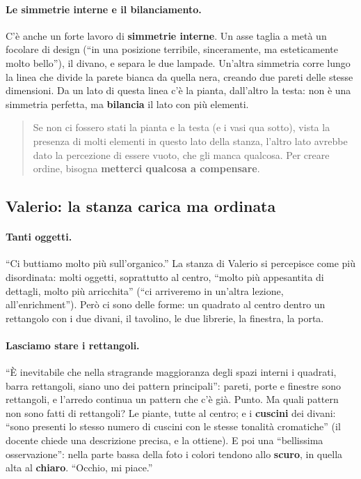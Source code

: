 \paragraph{Le simmetrie interne e il bilanciamento.} C'è anche un forte lavoro di
\textbf{simmetrie interne}. Un asse taglia a metà un focolare di design (``in una
posizione terribile, sinceramente, ma esteticamente molto bello''), il divano, e separa
le due lampade. Un'altra simmetria corre lungo la linea che divide la parete bianca da
quella nera, creando due pareti delle stesse dimensioni. Da un lato di questa linea c'è
la pianta, dall'altro la testa: non è una simmetria perfetta, ma \textbf{bilancia} il
lato con più elementi.
\begin{quote}
Se non ci fossero stati la pianta e la testa (e i vasi qua sotto), vista la presenza di
molti elementi in questo lato della stanza, l'altro lato avrebbe dato la percezione di
essere vuoto, che gli manca qualcosa. Per creare ordine, bisogna \textbf{metterci
qualcosa a compensare}.
\end{quote}

\subsection{Valerio: la stanza carica ma ordinata}

\paragraph{Tanti oggetti.} ``Ci buttiamo molto più sull'organico.'' La stanza di Valerio
si percepisce come più disordinata: molti oggetti, soprattutto al centro, ``molto più
appesantita di dettagli, molto più arricchita'' (``ci arriveremo in un'altra lezione,
all'enrichment''). Però ci sono delle forme: un quadrato al centro dentro un rettangolo
con i due divani, il tavolino, le due librerie, la finestra, la porta.

\paragraph{Lasciamo stare i rettangoli.} ``È inevitabile che nella stragrande maggioranza
degli spazi interni i quadrati, barra rettangoli, siano uno dei pattern principali'':
pareti, porte e finestre sono rettangoli, e l'arredo continua un pattern che c'è già.
Punto. Ma quali pattern non sono fatti di rettangoli? Le piante, tutte al centro; e i
\textbf{cuscini} dei divani: ``sono presenti lo stesso numero di cuscini con le stesse
tonalità cromatiche'' (il docente chiede una descrizione precisa, e la ottiene). E poi
una ``bellissima osservazione'': nella parte bassa della foto i colori tendono allo
\textbf{scuro}, in quella alta al \textbf{chiaro}. ``Occhio, mi piace.''

